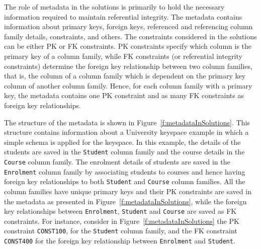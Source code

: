 The role of metadata in  the solutions is primarily to hold the necessary
 information required to maintain referential integrity. The metadata contains  
 information about primary keys,   foreign keys,  referenced and referencing
 column family details, constraints, and others.  The constraints considered in
 the solutions can be either \ac{PK} or \ac{FK} 
constraints. \ac{PK}
constraints specify which column is the primary key of a column family, while 
\ac{FK} constraints (or referential integrity constraints) determine the
foreign key relationship between two column families, that is, the
 column of a column family which  is dependent on the primary key  column of
 another column family.  Hence, for each column family with a primary key,  the
metadata  contains one \ac{PK} constraint  and  as
many \ac{FK} constraints as foreign key relationships. 

The structure of the metadata is shown in
Figure~\ref{f:metadataInSolutions}.  This structure contains information about a
University keyspace example in which  a simple schema is applied for the
keyspace. In this example,  the details of the students are saved in  the
\texttt{Student} column family and the course
 details in the \texttt{Course} column family.
 The enrolment details of students are saved in the 
\texttt{Enrolment} column family by associating students to courses and
hence having foreign key relationships to both \texttt{Student} and
\texttt{Course} column families.
All the column families have unique primary keys and their \ac{PK} constraints are saved in
the metadata as presented in Figure~\ref{f:metadataInSolutions}, while the
foreign key relationships between \texttt{Enrolment}, \texttt{Student} and
\texttt{Course} are saved as \ac{FK} constraints.  For instance, consider in
 Figure~\ref{f:metadataInSolutions} the \ac{PK} constraint \texttt{CONST100},
 for the \texttt{Student} column family, and the \ac{FK} constraint  
 \texttt{CONST400} for the foreign key relationship between
\texttt{Enrolment} and \texttt{Student}.

